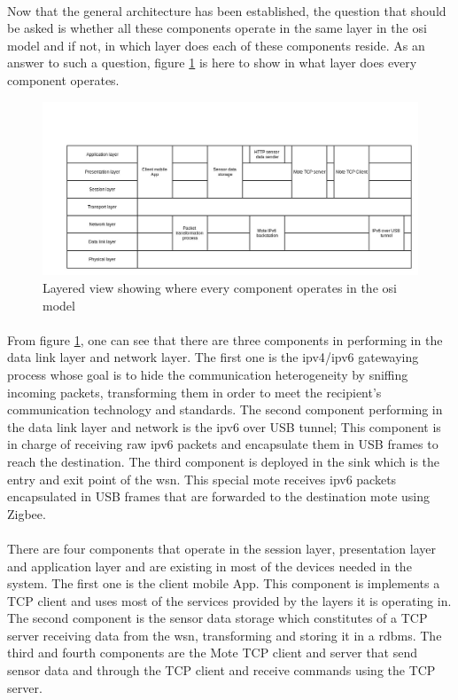 \documentclass[oneside,12pt,a4paper,final]{book}
\begin{document}
\paragraph{}
Now that the general architecture has been established, the question that should be asked is whether all these components operate in the same layer in the \gls{osi} model and if not, in which layer does each of these components reside. As an answer to such a question, figure \ref{fig:layered_view} is here to show in what layer does every component operates.

\begin{figure}[htbp]
\centering
\includegraphics[scale=0.40]{img/layered_view.jpg}
\caption{Layered view showing where every component operates in the \gls{osi} model}
\label{fig:layered_view}
\end{figure}

\paragraph{}
From figure \ref{fig:layered_view}, one can see that there are three components in performing in the data link layer and network layer. The first one is the \gls{ipv4}/\gls{ipv6} gatewaying process whose goal is to hide the communication heterogeneity by sniffing incoming packets, transforming them in order to meet the recipient's communication technology and standards. The second component performing in the data link layer and network is the \gls{ipv6} over USB tunnel; This component is in charge of receiving raw \gls{ipv6} packets and encapsulate them in  USB frames to reach the destination. The third component is deployed in the sink which is the entry and exit point of the \gls{wsn}. This special mote receives \gls{ipv6} packets encapsulated in USB frames that are forwarded to the destination mote using Zigbee.

\paragraph{}
There are four components that operate in the session layer, presentation layer and application layer and are existing in most of the devices needed in the system. The first one is the client mobile App. This component is implements a TCP client and uses most of the services provided by the layers it is operating in. The second component is the sensor data storage which constitutes of a TCP server receiving data from the \gls{wsn}, transforming and storing it in a \gls{rdbms}. The third and fourth components are the Mote TCP client and server that send sensor data and through the TCP client and receive commands using the TCP server. 
\end{document}
